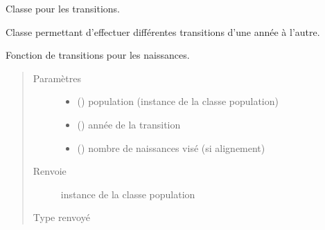 \documentclass[letterpaper,10pt,french]{sphinxmanual}
\begin{document}
\begin{fulllineitems}
\label{\detokenize{code:simgen.update}}
Classe pour les transitions.

Classe permettant d’effectuer différentes transitions d’une année à l’autre.

\begin{fulllineitems}
\label{\detokenize{code:simgen.update.birth}}
Fonction de transitions pour les naissances.
\begin{quote}\begin{description}
\item[{Paramètres}] \leavevmode\begin{itemize}
\item {} 
 ({\hyperref[\detokenize{code:simgen.population}]{}}) \textendash{} population (instance de la classe population)

\item {} 
 () \textendash{} année de la transition

\item {} 
 () \textendash{} nombre de naissances visé (si alignement)

\end{itemize}

\item[{Renvoie}] \leavevmode
instance de la classe population

\item[{Type renvoyé}] \leavevmode
{\hyperref[\detokenize{code:simgen.population}]{}}

\end{description}\end{quote}

\end{fulllineitems}



\end{fulllineitems}
\end{document}
